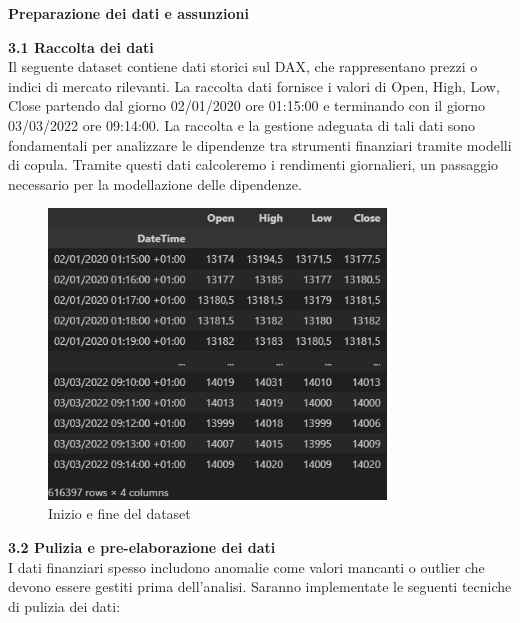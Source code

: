 \documentclass[a4paper,12pt]{article}
\begin{document}
\begin{center}
	\Huge \textbf{Preparazione dei dati e assunzioni} 
\end{center}

\vspace{1cm}
\noindent\textbf{3.1 Raccolta dei dati} \\

\noindent Il seguente dataset contiene dati storici sul DAX, che rappresentano prezzi o indici di mercato rilevanti. La raccolta dati fornisce i valori di Open, High, Low, Close partendo dal giorno 02/01/2020 ore 01:15:00 e terminando con il giorno 03/03/2022 ore 09:14:00. La raccolta e la gestione adeguata di tali dati sono fondamentali per analizzare le dipendenze tra strumenti finanziari tramite modelli di copula. Tramite questi dati calcoleremo i rendimenti giornalieri, un passaggio necessario per la modellazione delle dipendenze.\\
\begin{figure}[h] %
	\centering %
	\includegraphics[width=0.8\textwidth]{dfDax.png} %
	\caption{Inizio e fine del dataset} %
	\label{fig:immagine} %
\end{figure}
\newpage
\noindent\textbf{3.2 Pulizia e pre-elaborazione dei dati} \\

\noindent I dati finanziari spesso includono anomalie come valori mancanti o outlier che devono essere gestiti prima dell'analisi. Saranno implementate le seguenti tecniche di pulizia dei dati:
\end{document}
